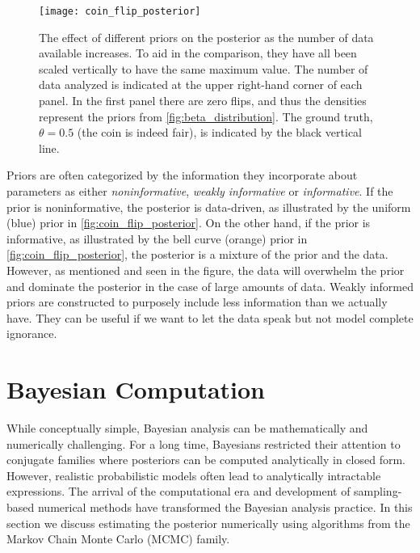 \begin{figure}[H]
    \centering
    \texttt{[image: coin\_flip\_posterior]}
    \caption{The effect of different priors on the posterior as the number of data available increases. To aid in the comparison, they have all been scaled vertically to have the same maximum value. The number of data analyzed is indicated at the upper right-hand corner of each panel. In the first panel there are zero flips, and thus the densities represent the priors from \autoref{fig:beta_distribution}. The ground truth, $\theta=0.5$ (the coin is indeed fair), is indicated by the black vertical line. 
    }
    \label{fig:coin_flip_posterior}
\end{figure} 

Priors are often categorized by the information they incorporate about parameters as either \textit{noninformative}, \textit{weakly informative} or \textit{informative}. If the prior is noninformative, the posterior is data-driven, as illustrated by the uniform (blue) prior in \autoref{fig:coin_flip_posterior}. On the other hand, if the prior is informative, as illustrated by the bell curve (orange) prior in \autoref{fig:coin_flip_posterior}, the posterior is a mixture of the prior and the data. However, as mentioned and seen in the figure, the data will overwhelm the prior and dominate the posterior in the case of large amounts of data. Weakly informed priors are constructed to purposely include less information than we actually have. They can be useful if we want to let the data speak but not model complete ignorance.



\section{Bayesian Computation}

While conceptually simple, Bayesian analysis can be mathematically and numerically challenging. For a long time, Bayesians restricted their attention to conjugate families where posteriors can be computed analytically in closed form. However, realistic probabilistic models often lead to analytically intractable expressions. The arrival of the computational era and development of sampling-based numerical methods have transformed the Bayesian analysis practice. In this section we discuss estimating the posterior numerically using algorithms from the Markov Chain Monte Carlo (MCMC) family. 


